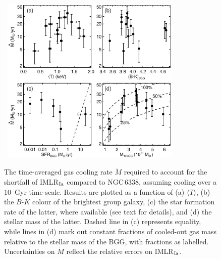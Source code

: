 \documentclass[useAMS,usenatbib]{mn2e}
\begin{document}
\begin{figure} 
 \mbox{\hspace{-2mm}
 \includegraphics[width=86mm]{fig16.eps}}
 \caption{The time-averaged gas cooling rate $\dot M$ required to
  account for the shortfall of IMLR$_{\rm Ia}$ compared to NGC\,6338,
  assuming cooling over a 10~Gyr time-scale. Results are plotted as a
  function of (a) $\langle T\rangle$, (b) the $B$-$K$ colour of the
  brightest group galaxy, (c) the star formation rate of the latter,
  where available (see text for details), and (d) the stellar mass of
  the latter. Dashed line in (c) represents equality, while lines in
  (d) mark out constant fractions of cooled-out gas mass relative to
  the stellar mass of the BGG, with fractions as labelled.
  Uncertainties on $\dot M$ reflect the relative errors on IMLR$_{\rm
  Ia}$.}
\label{fig,cc} 
\end{figure} 
\end{document}
